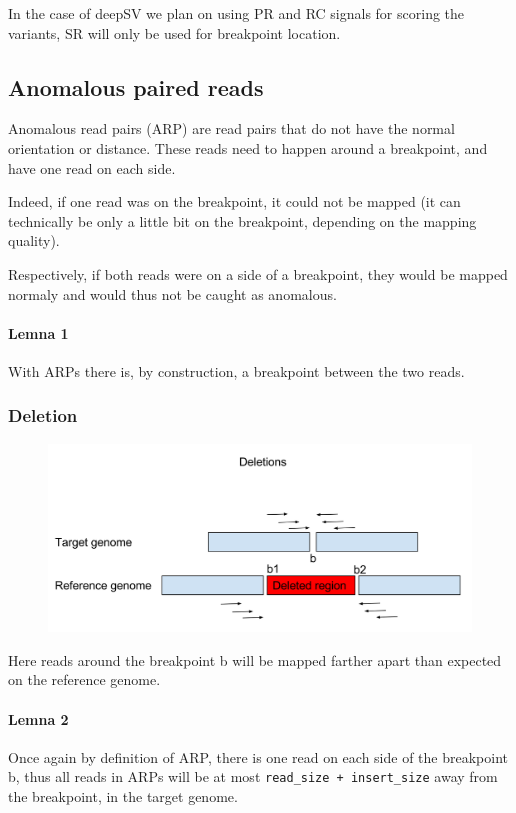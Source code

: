 \documentclass{article}
\begin{document}
In the case of deepSV we plan on using PR and RC signals for scoring the variants, SR will only
be used for breakpoint location.

\subsection{Anomalous paired reads}

Anomalous read pairs (ARP) are read pairs that do not have the normal orientation or distance.
These reads need to happen around a breakpoint, and have one read on each side.

Indeed, if one read was on the breakpoint, it could not be mapped (it can technically be only
a little bit on the breakpoint, depending on the mapping quality).

Respectively, if both reads were on a side of a breakpoint, they would be mapped normaly and would
thus not be caught as anomalous.

\paragraph{Lemna 1}  With ARPs there is, by construction, a breakpoint between the two reads.

\subsubsection{Deletion}

\begin{figure}[h]
\includegraphics[width=\textwidth]{DeletionPairedReads}
\end{figure}

Here reads around the breakpoint b will be mapped farther apart than expected on the reference
genome.

\paragraph{Lemna 2} Once again by definition of ARP, there is one read on each side of the breakpoint b, thus all reads in ARPs will be at most \verb|read_size + insert_size| away from the breakpoint, in the target genome.
\end{document}
